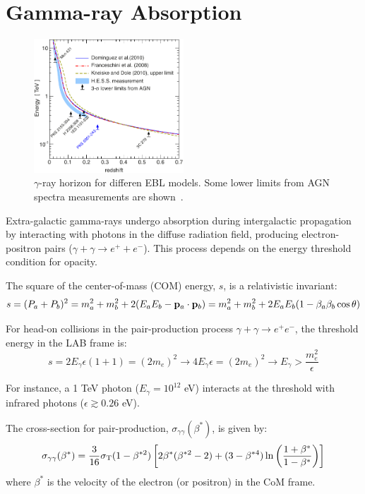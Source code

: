 \section{Gamma-ray Absorption}

\begin{figure}[t]
\centering
\includegraphics[width=0.5\textwidth]{figures/aa21639-13-fig6.pdf}
\caption{$\gamma$-ray horizon for differen EBL models. Some lower limits from AGN spectra measurements are shown~\cite{HESS2013aa}.}
\end{figure}

Extra-galactic gamma-rays undergo absorption during intergalactic propagation by interacting with photons in the diffuse radiation field, producing electron-positron pairs (\(\gamma + \gamma \rightarrow e^+ + e^-\)). This process depends on the energy threshold condition for opacity.

The square of the center-of-mass (COM) energy, \( s \), is a relativistic invariant:
%
\[
s = (P_a + P_b)^2 = m_a^2 + m_b^2 + 2(E_a E_b - \vb p_a \cdot \vb p_b) = m_a^2 + m_b^2 + 2E_a E_b (1 - \beta_a \beta_b \cos \theta)    
\]

For head-on collisions in the pair-production process \(\gamma + \gamma \rightarrow e^+ e^-\), the threshold energy in the LAB frame is:
%
\[
s = 2 E_\gamma \epsilon (1 + 1) = (2 m_e)^2 \rightarrow 4E_\gamma \epsilon = (2 m_e)^2 \rightarrow E_\gamma > \frac{m_e^2}{\epsilon}    
\]

For instance, a 1 TeV photon (\(E_\gamma = 10^{12}\) eV) interacts at the threshold with infrared photons (\(\epsilon \gtrsim 0.26\) eV).

The cross-section for pair-production, \(\sigma_{\gamma \gamma}(\beta^*)\), is given by:
%
\[
\sigma_{\gamma \gamma}(\beta^*) = \frac{3}{16} \sigma_{\rm T} (1-\beta^{*2}) \left[2 \beta^* (\beta^{*2}-2) + (3-\beta^{*4}) \ln \left( \frac{1+\beta^*}{1-\beta^*} \right) \right]
\]
%
where \(\beta^*\) is the velocity of the electron (or positron) in the CoM frame. 


